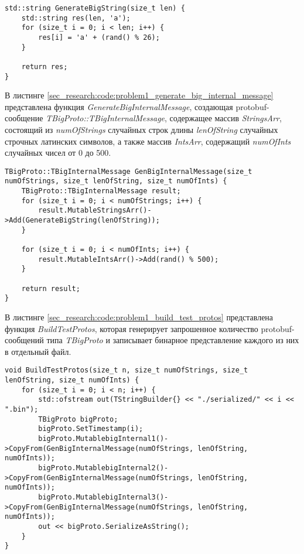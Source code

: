 \noindent\begin{minipage}{\linewidth}
\begin{lstlisting}[style=CodeListing, caption={Функция GenerateBigString}, label=sec_research:code:problem1_generate_big_string]
std::string GenerateBigString(size_t len) {
    std::string res(len, 'a');
    for (size_t i = 0; i < len; i++) {
        res[i] = 'a' + (rand() % 26);
    }

    return res;
}
\end{lstlisting}
\end{minipage}

В листинге \ref{sec_research:code:problem1_generate_big_internal_message} представлена функция \textit{GenerateBigInternalMessage}, создающая protobuf-сообщение \textit{TBigProto::TBigInternalMessage}, содержащее массив \textit{StringsArr}, состоящий из \textit{numOfStrings} случайных строк длины \textit{lenOfString} случайных строчных латинских символов, а также массив \textit{IntsArr}, содержащий \textit{numOfInts} случайных чисел от 0 до 500.

\noindent\begin{minipage}{\linewidth}
\begin{lstlisting}[style=CodeListing, caption={Функция GenerateBigInternalMessage}, label=sec_research:code:problem1_generate_big_internal_message]
TBigProto::TBigInternalMessage GenBigInternalMessage(size_t numOfStrings, size_t lenOfString, size_t numOfInts) {
    TBigProto::TBigInternalMessage result;
    for (size_t i = 0; i < numOfStrings; i++) {
        result.MutableStringsArr()->Add(GenerateBigString(lenOfString));
    }

    for (size_t i = 0; i < numOfInts; i++) {
        result.MutableIntsArr()->Add(rand() % 500);
    }

    return result;
}
\end{lstlisting}
\end{minipage}

В листинге \ref{sec_research:code:problem1_build_test_protos} представлена функция \textit{BuildTestProtos}, которая генерирует запрошенное количество protobuf-сообщений типа \textit{TBigProto} и записывает бинарное представление каждого из них в отдельный файл.

\noindent\begin{minipage}{\linewidth}
\begin{lstlisting}[style=CodeListing, caption={Функция BuildTestProtos}, label=sec_research:code:problem1_build_test_protos]
void BuildTestProtos(size_t n, size_t numOfStrings, size_t lenOfString, size_t numOfInts) {
    for (size_t i = 0; i < n; i++) {
        std::ofstream out(TStringBuilder{} << "./serialized/" << i << ".bin");
        TBigProto bigProto;
        bigProto.SetTimestamp(i);
        bigProto.MutablebigInternal1()->CopyFrom(GenBigInternalMessage(numOfStrings, lenOfString, numOfInts));
        bigProto.MutablebigInternal2()->CopyFrom(GenBigInternalMessage(numOfStrings, lenOfString, numOfInts));
        bigProto.MutablebigInternal3()->CopyFrom(GenBigInternalMessage(numOfStrings, lenOfString, numOfInts));
        out << bigProto.SerializeAsString();
    }
}
\end{lstlisting}
\end{minipage}

